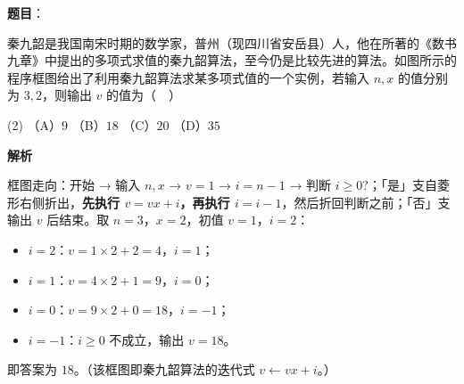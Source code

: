 \begin{answer}

\textbf{题目}：

秦九韶是我国南宋时期的数学家，普州（现四川省安岳县）人，他在所著的《数书九章》中提出的多项式求值的秦九韶算法，至今仍是比较先进的算法。如图所示的程序框图给出了利用秦九韶算法求某多项式值的一个实例，若输入 \(n,x\) 的值分别为 \(3,2\)，则输出 \(v\) 的值为（　）
\nopagebreak[4]
\begin{center}\end{center}
\nopagebreak[4]
\begin{gkopts}(2)
\task （A）\(9\)
\task （B）\(18\)
\task （C）\(20\)
\task （D）\(35\)
\end{gkopts}

\textbf{解析}

框图走向：开始 → 输入 \(n,x\) → \(v=1\) → \(i=n-1\) → 判断 \(i\geqslant0?\)；「是」支自菱形右侧折出，\textbf{先执行 \(v=vx+i\)，再执行 \(i=i-1\)}，然后折回判断之前；「否」支输出 \(v\) 后结束。取 \(n=3\)，\(x=2\)，初值 \(v=1\)，\(i=2\)：

\begin{itemize}
\item \(i=2\)：\(v=1\times2+2=4\)，\(i=1\)；
\item \(i=1\)：\(v=4\times2+1=9\)，\(i=0\)；
\item \(i=0\)：\(v=9\times2+0=18\)，\(i=-1\)；
\item \(i=-1\)：\(i\geqslant0\) 不成立，输出 \(v=18\)。
\end{itemize}

即答案为 \(18\)。（该框图即秦九韶算法的迭代式 \(v\leftarrow vx+i\)。）


\end{answer}
